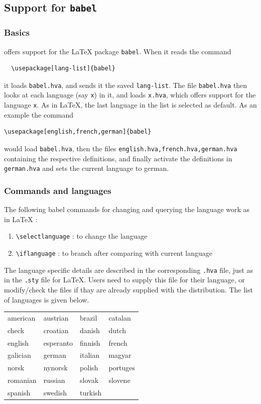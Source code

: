 \subsection{Support for \texttt{babel}}
\subsubsection{Basics}
\hevea{} offers support for the \LaTeX{} package {\tt babel}. When it reads the command
\begin{verbatim}
  \usepackage[lang-list]{babel}
\end{verbatim}
it loads {\tt babel.hva}, and sends it the saved {\tt lang-list}. The
file {\tt babel.hva} then looks at each language (say {\tt{}x}) in it, and loads {\tt x.hva}, which offers support for the language {\tt x}. As in \LaTeX, the last language in the list is selected as default. As an example the command
\begin{verbatim}
\usepackage[english,french,german]{babel}
\end{verbatim}
would load {\tt babel.hva}, then the files {\tt english.hva,french.hva,german.hva} containing the respective definitions, and finally activate the definitions in {\tt german.hva} and sets the current language to german.

\subsubsection{Commands and languages}
The following babel commands for changing and querying the language work as in \LaTeX{} :
\begin{enumerate}
\item {\verb+\selectlanguage+ : to change the language}
\item {\verb+\iflanguage+ : to branch after comparing with current language}
\end{enumerate}  

The language specific details are described in the corresponding
\verb+.hva+ file, just as in the \verb+.sty+ file for \LaTeX. Users
need to supply this file for their language, or modify/check the files
if thay are already supplied with the distribution. The list of
languages is given below.

\begin{center}
\begin{tabular}{|l|l|l|l|}
\hline
american & austrian & brazil & catalan \\
check & croatian & danish & dutch \\
english & esperanto & finnish & french \\
galician & german & italian & magyar \\
norsk & nynorsk & polish & portuges \\
romanian & russian & slovak & slovene \\
spanish & swedish & turkish & \\
\hline
\end{tabular}
\end{center}

